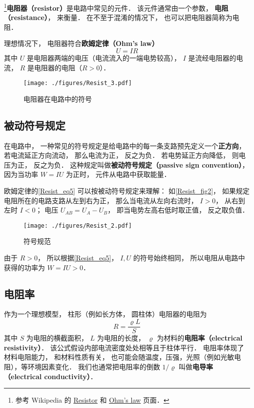

\footnote{参考 Wikipedia 的 \href{https://en.wikipedia.org/wiki/Resistor}{Resistor} 和 \href{https://en.wikipedia.org/wiki/Ohm's_law}{Ohm's law} 页面．}\textbf{电阻器（resistor）}是电路中常见的元件． 该元件通常由一个参数， \textbf{电阻（resistance）}， 来衡量． 在不至于混淆的情况下， 也可以把电阻器简称为电阻．

理想情况下， 电阻器符合\textbf{欧姆定律（Ohm's law）}
\begin{equation}\label{Resist_eq5}
U = IR
\end{equation}
其中 $U$ 是电阻器两端的电压（电流流入的一端电势较高）， $I$ 是流经电阻器的电流， $R$ 是电阻器的电阻（$R > 0$）．

\begin{figure}[ht]
\centering
\texttt{[image: ./figures/Resist\_3.pdf]}
\caption{电阻器在电路中的符号} \label{Resist_fig3}
\end{figure}

\subsection{被动符号规定}\label{Resist_sub1}
在电路中， 一种常见的符号规定是给电路中的每一条支路预先定义一个\textbf{正方向}， 若电流延正方向流动， 那么电流为正， 反之为负． 若电势延正方向降低， 则电压为正， 反之为负． 这种规定叫做\textbf{被动符号规定（passive sign convention）}， 因为当功率 $W = IU$ 为正时， 元件从电路中获取能量．

欧姆定律的\autoref{Resist_eq5} 可以按被动符号规定来理解： 如\autoref{Resist_fig2}， 如果规定电阻所在的电路支路从左到右为正， 那么当电流从左向右流时， $I > 0$， 从右到左时 $I < 0$； 电压 $U_{AB} = U_A - U_B$， 即当电势左高右低时取正值， 反之取负值．

\begin{figure}[ht]
\centering
\texttt{[image: ./figures/Resist\_2.pdf]}
\caption{符号规范} \label{Resist_fig2}
\end{figure}

由于 $R > 0$， 所以根据\autoref{Resist_eq5}， $I, U$ 的符号始终相同， 所以电阻从电路中获得的功率为 $W = IU > 0$．

\subsection{电阻率}
作为一个理想模型， 柱形（例如长方体， 圆柱体）电阻器的电阻为
\begin{equation}
R = \frac{\varrho L}{S} 
\end{equation}
其中 $S$ 为电阻的横截面积， $L$ 为电阻的长度， $\varrho$ 为材料的\textbf{电阻率（electrical resistivity）}． 该公式假设内部电流密度处处相等且于柱体平行． 电阻率体现了材料电阻能力， 和材料性质有关， 也可能会随温度，压强，光照（例如光敏电阻），等环境因素变化． 我们也通常把电阻率的倒数 $1/\varrho$ 叫做\textbf{电导率（electrical conductivity）}．

